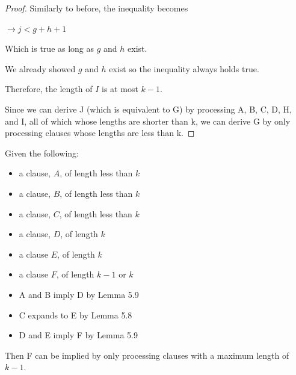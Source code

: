 \documentclass[manuscript]{acmart}
\begin{document}
\begin{proof}
        Similarly to before, the inequality becomes
        
        $\rightarrow j < g + h + 1$

        Which is true as long as $g$ and $h$ exist. 

        We already showed $g$ and $h$ exist so the inequality always 
        holds true.

        Therefore, the length of $I$ is at most $k - 1$.

        Since we can derive J (which is equivalent to G) by processing
        A, B, C, D, H, and I, all of which whose lengths are shorter than k, 
        we can derive G by only processing clauses whose lengths are 
        less than k.
    \end{proof}

    \begin{lemma}
        Given the following:
        \begin{itemize}
            \item a clause, $A$, of length less than $k$
            \item a clause, $B$, of length less than $k$
            \item a clause, $C$, of length less than $k$
            \item a clause, $D$, of length $k$
            \item a clause $E$, of length $k$
            \item a clause $F$, of length $k - 1$ or $k$
            \item A and B imply D by Lemma 5.9
            \item C expands to E by Lemma 5.8
            \item D and E imply F by Lemma 5.9
        \end{itemize}
        Then F can be implied by only processing clauses with a maximum
        length of $k-1$.
    \end{lemma}
\end{document}
